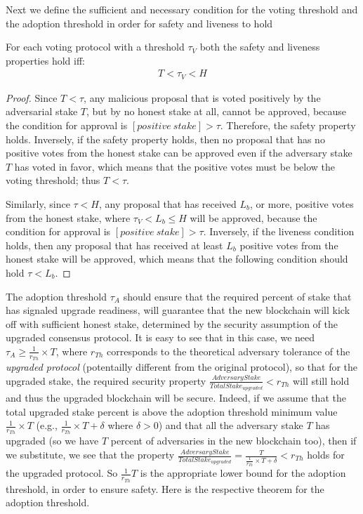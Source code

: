 Next we define the sufficient and necessary condition for the voting threshold 
and the adoption threshold in order for safety and liveness to hold
\begin{theorem}\label{th:safety_and_liveness_condition_voting}
	For each voting protocol with a threshold $\tau_V$ 
	both the safety and liveness properties hold iff:
	\begin{align*} 
		T < \tau_V < H 
	\end{align*}
	\begin{proof}
		Since $T < \tau$, any malicious proposal that is voted positively by 
		the adversarial stake $T$, but by no honest stake at all, cannot be 
		approved, because the condition for approval is $[positive\ stake] > 
		\tau$. Therefore, the safety property holds. Inversely, if the safety 
		property holds, then no proposal that has no positive votes from the 
		honest stake can be approved even if the adversary stake $T$ has 
		voted in favor, which means that the positive votes must be below the 
		voting threshold; thus $T < \tau$. 
		
		Similarly, since $\tau < H$, any proposal that has 
		received $L_b$, or more, positive votes from the honest stake, where $ 
		\tau_V < L_b \leq H$ will be 
		approved, because the condition for approval is $[positive\ stake] > 
		\tau$. Inversely, if the liveness condition holds, then any proposal 
		that has received at least $L_b$ positive votes from the honest stake 
		will be approved, which means that the following 
		condition should hold $\tau < L_b$.
	\end{proof}
\end{theorem}

The adoption threshold $\tau_A$ should ensure that the required percent of 
stake that has signaled upgrade readiness, will guarantee that 
the new blockchain will kick off with sufficient honest stake, determined by 
the 
security assumption of the upgraded consensus protocol. It is easy to 
see that in this case, we need $\tau_A \geq \frac{1}{r_{Th}} \times T$, where 
$r_{Th}$ corresponds to the theoretical adversary tolerance of the 
\emph{upgraded protocol} (potentailly different from the original protocol),  
so that for the upgraded stake, the required security property
$\frac{AdversaryStake}{TotalStake_{upgraded}} < r_{Th}$ will still hold and 
thus the upgraded blockchain will be secure. Indeed, if we assume that the 
total upgraded stake percent is above the adoption threshold minimum value 
$\frac{1}{r_{Th}} \times T$ (e.g., $\frac{1}{r_{Th}} \times T + \delta$ where 
$\delta > 0$) and that all the adversary stake $T$ has upgraded (so we have $T$ 
percent of adversaries in the new blockchain too), then if we 
substitute, we see that the property 
$\frac{AdversaryStake}{TotalStake_{upgraded}} = \frac{T}{\frac{1}{r_{Th}} 
\times T + \delta} < r_{Th}$ holds for the upgraded protocol. So 
$\frac{1}{r_{Th}} T$ is the appropriate lower bound for the adoption threshold, 
in order to ensure safety. Here is the respective theorem for the adoption 
threshold.

